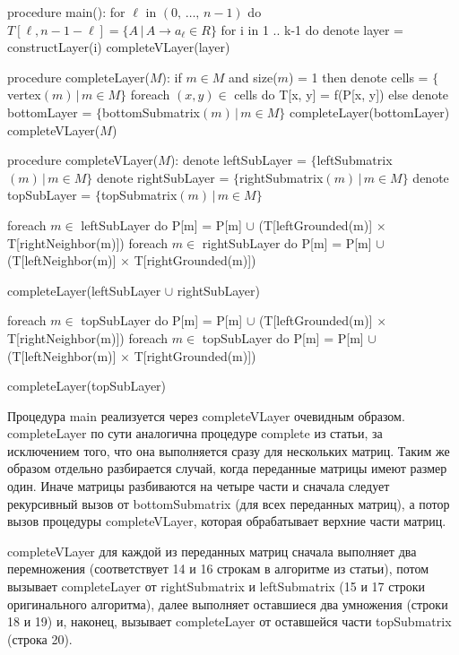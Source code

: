 \documentclass[12pt]{article}  %
\theoremstyle{definition}
\theoremstyle{remark}
\begin{document}
\begin{algorithm}[caption={Algorithm.}, label={main}]
procedure main():
  for $\ell$ in $(0,\,\dots,\,n-1)$ do
    $T[\ell, n-1-\ell] = \{A\,|\,A \to a_{\ell} \in R\}$
  for i in 1 .. k-1 do
    denote layer = constructLayer(i)
    completeVLayer(layer)  

procedure completeLayer($M$):
  if $m \in M$ and size($m$) = 1 then
    denote cells = $\{$vertex$(m)\,|\, m \in M\}$
    foreach $(x, y) \in $ cells do
      T[x, y] = f(P[x, y])
  else
    denote bottomLayer = $\{$bottomSubmatrix$(m)\,|\,m \in M\}$
    completeLayer(bottomLayer)
    completeVLayer($M$)     

procedure completeVLayer($M$):
  denote leftSubLayer = $\{$leftSubmatrix$(m)\,|\,m \in M\}$
  denote rightSubLayer = $\{$rightSubmatrix$(m)\,|\,m \in M\}$
  denote topSubLayer = $\{$topSubmatrix$(m)\,|\,m \in M\}$

  foreach $m \in$ leftSubLayer do
    P[m] = P[m] $\cup$ (T[leftGrounded(m)] $\times$ T[rightNeighbor(m)])
  foreach $m \in$ rightSubLayer do
    P[m] = P[m] $\cup$ (T[leftNeighbor(m)] $\times$ T[rightGrounded(m)])

  completeLayer(leftSubLayer $\cup$ rightSubLayer)

  foreach $m \in$ topSubLayer do
    P[m] = P[m] $\cup$ (T[leftGrounded(m)] $\times$ T[rightNeighbor(m)])
  foreach $m \in$ topSubLayer do
    P[m] = P[m] $\cup$ (T[leftNeighbor(m)] $\times$ T[rightGrounded(m)])

  completeLayer(topSubLayer)  
\end{algorithm}

Процедура main реализуется через completeVLayer очевидным образом. completeLayer по сути аналогична процедуре complete из статьи, за исключением того, что она выполняется сразу для нескольких матриц. Таким же образом отдельно разбирается случай, когда переданные матрицы имеют размер один. Иначе матрицы разбиваются на четыре части и сначала следует рекурсивный вызов от bottomSubmatrix (для всех переданных матриц), а потор вызов процедуры completeVLayer, которая обрабатывает верхние части матриц. 

completeVLayer для каждой из переданных матриц сначала выполняет два перемножения (соответствует 14 и 16 строкам в алгоритме из статьи), потом вызывает completeLayer от rightSubmatrix и leftSubmatrix (15 и 17 строки оригинального алгоритма), далее выполняет оставшиеся два умножения (строки 18 и 19) и, наконец, вызывает completeLayer от оставшейся части topSubmatrix (строка 20).
\end{document}

